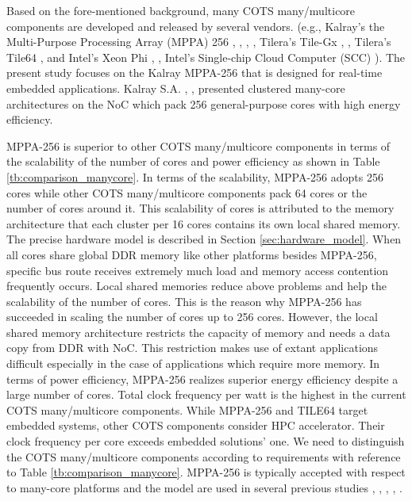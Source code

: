 \documentclass{sig-alternate-05-2015}
\begin{document}
Based on the fore-mentioned background, many COTS many/multicore components are developed and released by several vendors.
(e.g., Kalray's the Multi-Purpose Processing Array (MPPA) 256 \cite{de2013distributed}, \cite{de2013clustered}, \cite{de2014time}, \cite{baron2010single}, Tilera's Tile-Gx \cite{schooler2010tile}, \cite{ramey2011tile}, Tilera's Tile64 \cite{bell2008tile64}, and Intel's Xeon Phi \cite{chrysos2014intel}, \cite{chrysos2012intel}, Intel's Single-chip Cloud Computer (SCC) \cite{baron2010single}).
The present study focuses on the Kalray MPPA-256 that is designed for real-time embedded applications.
Kalray S.A. \cite{de2013distributed}, \cite{de2013clustered}, \cite{de2014time} presented clustered many-core architectures on the NoC which pack 256 general-purpose cores with high energy efficiency.

MPPA-256 is superior to other COTS many/multicore components in terms of the scalability of the number of cores and power efficiency as shown in Table \ref{tb:comparison_manycore}.
In terms of the scalability, MPPA-256 adopts 256 cores while other COTS many/multicore components pack 64 cores or the number of cores around it.
This scalability of cores is attributed to the memory architecture that each cluster per 16 cores contains its own local shared memory.
The precise hardware model is described in Section \ref{sec:hardware_model}.
When all cores share global DDR memory like other platforms besides MPPA-256, specific bus route receives extremely much load and memory access contention frequently occurs.
Local shared memories reduce above problems and help the scalability of the number of cores.
This is the reason why MPPA-256 has succeeded in scaling the number of cores up to  256 cores.
However, the local shared memory architecture restricts the capacity of memory and needs a data copy from DDR with NoC.
This restriction makes use of extant applications difficult especially in the case of applications which require more memory.
In terms of power efficiency, MPPA-256 realizes superior energy efficiency despite a large number of cores.
Total clock frequency per watt is the highest in the current COTS many/multicore components.
While MPPA-256 and TILE64 \cite{bell2008tile64} target embedded systems, other COTS components consider HPC accelerator.
Their clock frequency per core exceeds embedded solutions' one.
We need to distinguish the COTS many/multicore components according to requirements with reference to Table \ref{tb:comparison_manycore}.
MPPA-256 is typically accepted with respect to many-core platforms and the model are used in several previous studies \cite{perret2016temporal}, \cite{becker2016contention}, \cite{carle2014static}, \cite{perret2016mapping}, \cite{perret2016predictable}.
\end{document}
